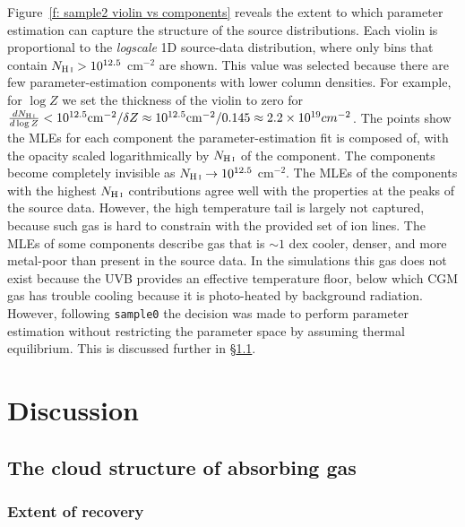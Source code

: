 \documentclass[fleqn,usenatbib]{mnras}
\begin{document}
Figure~\ref{f: sample2 violin vs components} reveals the extent to which parameter estimation can capture the structure of the source distributions.
Each violin is proportional to the \textit{logscale} 1D source-data distribution,
where only bins that contain $N_{\ion{H}{I}} > 10^{12.5}$ cm$^{-2}$ are shown.
This value was selected because there are few parameter-estimation components with lower column densities.
For example, for $\log Z$ we set the thickness of the violin to zero for $\frac{dN_{\ion{H}{I}}}{d\log Z} < 10^{12.5} {\rm cm}^{-2} / \delta Z \approx 10^{12.5} {\rm cm}^{-2} / 0.145 \approx 2.2 \times 10^{19} cm^{-2} $.
The points show the MLEs for each component the parameter-estimation fit is composed of,
with the opacity scaled logarithmically by $N_{\ion{H}{I}}$ of the component.
The components become completely invisible as $N_{\ion{H}{I}} \rightarrow 10^{12.5}$ cm$^{-2}$.
The MLEs of the components with the highest $N_{\ion{H}{I}}$ contributions agree well with the properties at the peaks of the source data.
However, the high temperature tail is largely not captured, because such gas is hard to constrain with the provided set of ion lines.
The MLEs of some components describe gas that is $\sim 1$ dex cooler, denser, and more metal-poor than present in the source data.
In the simulations this gas does not exist because the UVB provides an effective temperature floor,
below which CGM gas has trouble cooling because it is photo-heated by background radiation.
However, following \texttt{sample0} the decision was made to perform parameter estimation without restricting the parameter space by assuming thermal equilibrium.
This is discussed further in \S\ref{s: discussion -- cloud structure}.

\section{Discussion}
\label{s: discussion}

\subsection{The cloud structure of absorbing gas}
\label{s: discussion -- cloud structure}

\subsubsection{Extent of recovery}
\label{s: discussion -- cloud structure -- recovery}
\end{document}
